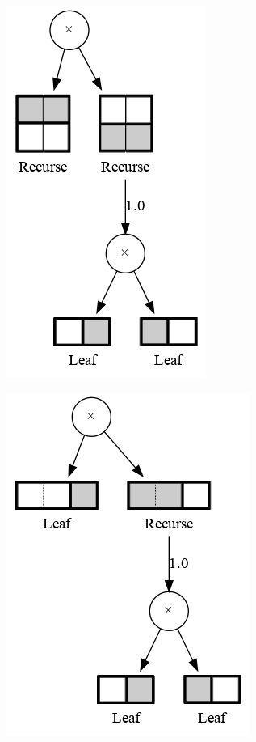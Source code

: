 \documentclass{amsart}
\theoremstyle{plain}
\numberwithin{equation}{section}
\begin{document}
\begin{figure}[h]
  \centering
  \begin{subfigure}[b]{0.3\linewidth}
    \centering\includegraphics[scale=0.35]{graphs/cc2.png}
    \caption{\label{fig:basex-1}}
  \end{subfigure}
  \begin{subfigure}[b]{0.3\linewidth}
    \centering\includegraphics[scale=0.35]{graphs/cc3.png}
    \caption{\label{fig:basex-2}}

\end{subfigure}
\end{figure}
\end{document}
